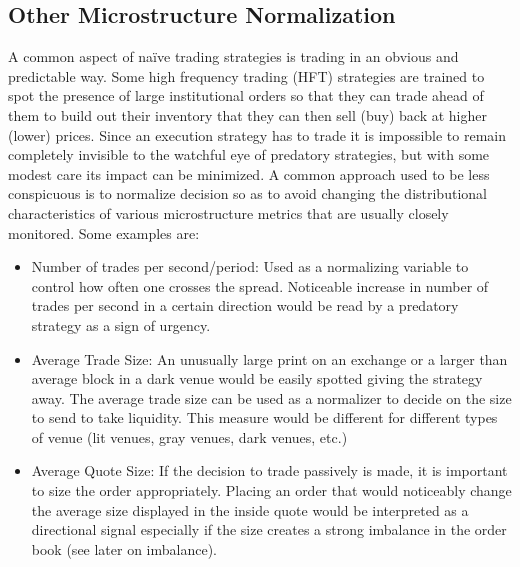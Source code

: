 \subsection{Other Microstructure Normalization}

A common aspect of na\"ive trading strategies is trading in an obvious and predictable way. Some high frequency trading (HFT) strategies are trained to spot the presence of large institutional orders so that they can trade ahead of them to build out their inventory that they can then sell (buy) back at higher (lower) prices. Since an execution strategy has to trade it is impossible to remain completely invisible to the watchful eye of predatory strategies, but with some modest care its impact can be minimized. A common approach used to be less conspicuous is to normalize decision so as to avoid changing the distributional characteristics of various microstructure metrics that are usually closely monitored. Some examples are:
        \begin{itemize}
        	\item Number of trades per second/period: Used as a normalizing variable to control how often one crosses the spread. Noticeable increase in number of trades per second in a certain direction would be read by a predatory strategy as a sign of urgency.
        	\item Average Trade Size: An unusually large print on an exchange or a larger than average block in a dark venue would be easily spotted giving the strategy away. The average trade size can be used as a normalizer to decide on the size to send to take liquidity.  This measure would be different for different types of venue (lit venues, gray venues, dark venues, etc.)
        	\item Average Quote Size: If the decision to trade passively is made, it is important to size the order appropriately. Placing an order that would noticeably change the average size displayed in the inside quote would be interpreted as a directional signal especially if the size creates a strong imbalance in the order book (see later on imbalance).
        \end{itemize}


